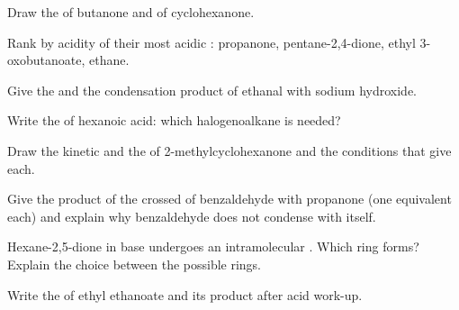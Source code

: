 \begin{exercise}[$\star$]\label{exo:b2:enolates-aldol:1}
Draw the   of butanone and of cyclohexanone.
\end{exercise}

\begin{exercise}[$\star$]\label{exo:b2:enolates-aldol:2}
Rank by acidity of their most acidic : propanone, pentane-2,4-dione, ethyl 3-oxobutanoate,
ethane.
\end{exercise}

\begin{exercise}[$\star$]\label{exo:b2:enolates-aldol:3}
Give the  and the condensation product of ethanal with sodium hydroxide.
\end{exercise}

\begin{exercise}[$\star$]\label{exo:b2:enolates-aldol:4}
Write the  of hexanoic acid: which halogenoalkane is needed?
\end{exercise}

\begin{exercise}[$\star\star$]\label{exo:b2:enolates-aldol:5}
Draw the kinetic and the  of 2-methylcyclohexanone and the conditions that give
each.
\end{exercise}

\begin{exercise}[$\star\star$]\label{exo:b2:enolates-aldol:6}
Give the product of the crossed  of benzaldehyde with propanone (one equivalent
each) and explain why benzaldehyde does not condense with itself.
\end{exercise}

\begin{exercise}[$\star\star$]\label{exo:b2:enolates-aldol:7}
Hexane-2,5-dione in base undergoes an intramolecular . Which ring forms? Explain the
choice between the possible rings.
\end{exercise}

\begin{exercise}[$\star\star$]\label{exo:b2:enolates-aldol:8}
Write the  of ethyl ethanoate and its product after acid work-up.
\end{exercise}

